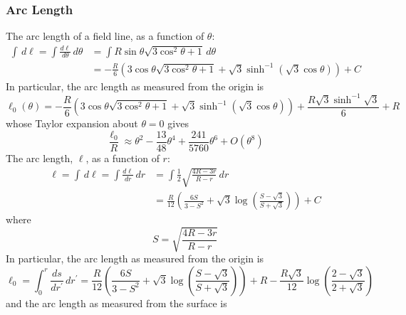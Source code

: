 \documentclass{article}
\newcommand{\deriv}[2]{\frac{d{#1}}{d{#2}}}
\begin{document}
\subsubsection{Arc Length}
The arc length of a field line, as a function of $\theta$:
\begin{equation}
    \begin{aligned}
        \int\,d\ell = \int\deriv{\ell}{\theta}\,d\theta
            &= \int R\sin\theta \sqrt{3\cos^2\theta + 1} \, d\theta \\
            &= -\frac{R}{6}\left(3\cos\theta\sqrt{3\cos^2\theta + 1} + \sqrt{3}\sinh^{-1}(\sqrt{3}\cos\theta)\right) + C
    \end{aligned}
\end{equation}
In particular, the arc length as measured from the origin is
\begin{equation}
    \ell_0(\theta) = -\frac{R}{6}\left(3\cos\theta\sqrt{3\cos^2\theta + 1} + \sqrt{3}\sinh^{-1}(\sqrt{3}\cos\theta)\right) +
                      \frac{R\sqrt{3}\sinh^{-1}\sqrt{3}}{6} + R
\end{equation}
whose Taylor expansion about $\theta = 0$ gives
\begin{equation}
    \frac{\ell_0}{R} \approx \theta^2 - \frac{13}{48}\theta^4 + \frac{241}{5760}\theta^6 + O(\theta^8)
    \label{eqn:arclengthth}
\end{equation}
The arc length, $\ell$, as a function of $r$:
\begin{equation}
    \begin{aligned}
        \ell = \int\,d\ell = \int\deriv{\ell}{r}\,dr
            &= \int \frac12 \sqrt{\frac{4R-3r}{R-r}} \, dr \\
            &= \frac{R}{12}\left(\frac{6S}{3 - S^2} + \sqrt{3}\log\left(\frac{S - \sqrt{3}}{S + \sqrt{3}}\right)\right) + C
    \end{aligned}
\end{equation}
where
\begin{equation}
    S = \sqrt{\frac{4R-3r}{R-r}}
\end{equation}
In particular, the arc length as measured from the origin is
\begin{equation}
    \ell_0 = \int_0^r \deriv{s}{r^\prime} \,dr^\prime
           = \frac{R}{12}\left(\frac{6S}{3 - S^2} + \sqrt{3}\log\left(\frac{S - \sqrt{3}}{S + \sqrt{3}}\right)\right) +
             R - \frac{R\sqrt{3}}{12}\log\left(\frac{2-\sqrt{3}}{2+\sqrt{3}}\right)
\end{equation}
and the arc length as measured from the surface is
\end{document}
